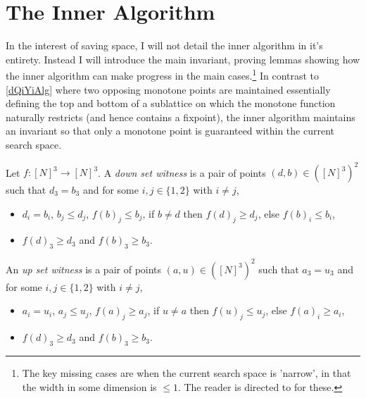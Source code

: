 \section{The Inner Algorithm} \label{innerAlgChap}
In the interest of saving space, I will not detail the inner algorithm in it's entirety.
Instead I will introduce
the main invariant, proving lemmas showing how the inner algorithm
can make progress in the main cases.\footnote{The key missing cases are when the current search space is 'narrow',
in that the width in some dimension is $\leq 1$.
The reader is directed to \citep{fasterTarski} for these.} In contrast to
\cref{dQiYiAlg} where two opposing monotone points are maintained essentially
defining the top and bottom of a sublattice on which the monotone function
naturally restricts (and hence contains a fixpoint), 
the inner algorithm maintains an invariant so that only a monotone point is guaranteed
within the current search space.
\begin{definition} \label{witnessDef}
  Let $f : [N]^3 \to [N]^3$. A \emph{down set witness} is a pair of points
  $(d, b) \in ([N]^3)^2$ such that $d_3 = b_3$ and for some $i, j \in \{1, 2\}$
  with $i \neq j$,
  \begin{itemize}
    \item $d_i = b_i$, $b_j \leq d_j$, $f(b)_j \leq b_j$, if $b \neq d$ then $f(d)_j \geq d_j$, else $f(b)_i \leq b_i$,
    \item $f(d)_3 \geq d_3$ and $f(b)_3 \geq b_3$.
  \end{itemize}
  An \emph{up set witness} is a pair of points
  $(a, u) \in ([N]^3)^2$ such that $a_3 = u_3$ and for some $i, j \in \{1, 2\}$
  with $i \neq j$, 
  \begin{itemize}
    \item $a_i = u_i$, $a_j \leq u_j$, $f(a)_j \geq a_j$, if $u \neq a$ then $f(u)_j \leq u_j$, else $f(a)_i \geq a_i$,
    \item $f(d)_3 \geq d_3$ and $f(b)_3 \geq b_3$.
  \end{itemize}
\end{definition}

